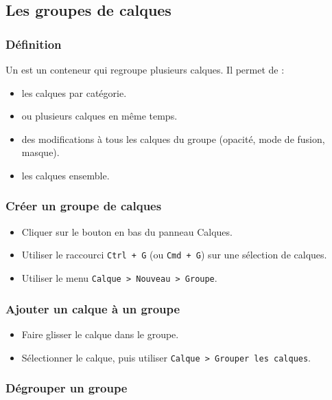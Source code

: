 \subsection{Les groupes de calques}

\subsubsection{Définition}

Un  est un conteneur qui regroupe plusieurs calques. Il permet de :

\begin{itemize}
    \item {} les calques par catégorie.
    \item {} ou  plusieurs calques en même temps.
    \item {} des modifications à tous les calques du groupe (opacité, mode de fusion, masque).
    \item {} les calques ensemble.
\end{itemize}

\subsubsection{Créer un groupe de calques}

\begin{itemize}
    \item Cliquer sur le bouton  en bas du panneau Calques.
    \item Utiliser le raccourci \texttt{Ctrl + G} (ou \texttt{Cmd + G}) sur une sélection de calques.
    \item Utiliser le menu \texttt{Calque > Nouveau > Groupe}.
\end{itemize}

\subsubsection{Ajouter un calque à un groupe}

\begin{itemize}
    \item Faire glisser le calque dans le groupe.
    \item Sélectionner le calque, puis utiliser \texttt{Calque > Grouper les calques}.
\end{itemize}

\subsubsection{Dégrouper un groupe}


